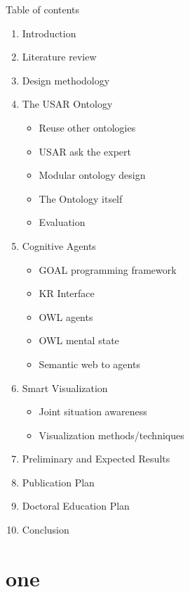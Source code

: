 Table of contents
\tableofcontents

\begin{enumerate}
\item Introduction
\item Literature review
\item Design methodology
\item The USAR Ontology
\begin{itemize}
\item Reuse other ontologies
\item USAR ask the expert 
\item Modular ontology design
\item The Ontology itself
\item Evaluation
\end{itemize}

\item Cognitive Agents
\begin{itemize}
\item GOAL programming framework
\item KR Interface
\item OWL agents
\item OWL mental state
\item Semantic web to agents
\end{itemize}

\item Smart Visualization
\begin{itemize}
\item Joint situation awareness
\item Visualization methods/techniques
\end{itemize}

\item Preliminary and Expected Results
\item Publication Plan
\item Doctoral Education Plan
\item Conclusion
\end{enumerate}
    
    
  \chapter{one}
  
  
  
  
  
  
  